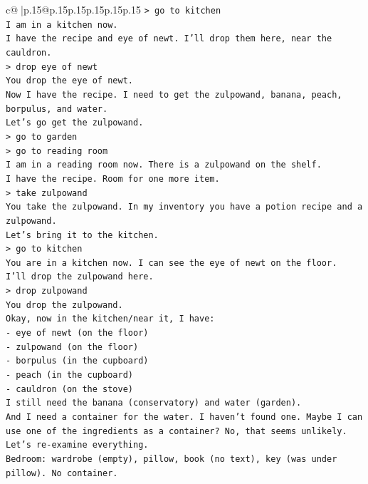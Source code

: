 \documentclass{article}
\begin{document}
{\begin{supertabular}{c@{$\;$}|p{.15\linewidth}@{}p{.15\linewidth}p{.15\linewidth}p{.15\linewidth}p{.15\linewidth}p{.15\linewidth}}
{{{\texttt{> go to kitchen} \\
\texttt{I am in a kitchen now.} \\
\texttt{I have the recipe and eye of newt. I'll drop them here, near the cauldron.} \\
\texttt{> drop eye of newt} \\
\texttt{You drop the eye of newt.} \\
\texttt{Now I have the recipe. I need to get the zulpowand, banana, peach, borpulus, and water.} \\
\texttt{Let's go get the zulpowand.} \\
\texttt{> go to garden} \\
\texttt{> go to reading room} \\
\texttt{I am in a reading room now. There is a zulpowand on the shelf.} \\
\texttt{I have the recipe. Room for one more item.} \\
\texttt{> take zulpowand} \\
\texttt{You take the zulpowand. In my inventory you have a potion recipe and a zulpowand.} \\
\texttt{Let's bring it to the kitchen.} \\
\texttt{> go to kitchen} \\
\texttt{You are in a kitchen now. I can see the eye of newt on the floor.} \\
\texttt{I'll drop the zulpowand here.} \\
\texttt{> drop zulpowand} \\
\texttt{You drop the zulpowand.} \\
\texttt{Okay, now in the kitchen/near it, I have:} \\
\texttt{{-} eye of newt (on the floor)} \\
\texttt{{-} zulpowand (on the floor)} \\
\texttt{{-} borpulus (in the cupboard)} \\
\texttt{{-} peach (in the cupboard)} \\
\texttt{{-} cauldron (on the stove)} \\
\texttt{I still need the banana (conservatory) and water (garden).} \\
\texttt{And I need a container for the water. I haven't found one. Maybe I can use one of the ingredients as a container? No, that seems unlikely. Let's re{-}examine everything.} \\
\texttt{Bedroom: wardrobe (empty), pillow, book (no text), key (was under pillow). No container.} \\
}}}
\end{supertabular}}
\end{document}
